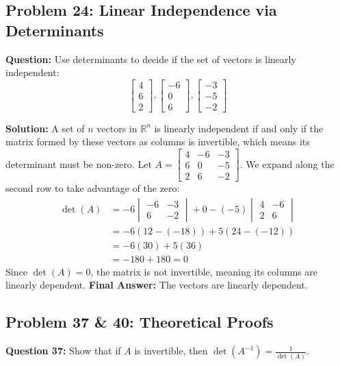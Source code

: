 \documentclass{article}
\begin{document}
\subsection{Problem 24: Linear Independence via Determinants}
\textbf{Question:} Use determinants to decide if the set of vectors is linearly independent:
\[ \begin{bmatrix} 4 \\ 6 \\ 2 \end{bmatrix}, \begin{bmatrix} -6 \\ 0 \\ 6 \end{bmatrix}, \begin{bmatrix} -3 \\ -5 \\ -2 \end{bmatrix} \]

\textbf{Solution:}
A set of $n$ vectors in $\mathbb{R}^n$ is linearly independent if and only if the matrix formed by these vectors as columns is invertible, which means its determinant must be non-zero.
Let $A = \begin{bmatrix} 4 & -6 & -3 \\ 6 & 0 & -5 \\ 2 & 6 & -2 \end{bmatrix}$.
We expand along the second row to take advantage of the zero:
\begin{align*}
    \det(A) &= -6 \begin{vmatrix} -6 & -3 \\ 6 & -2 \end{vmatrix} + 0 - (-5) \begin{vmatrix} 4 & -6 \\ 2 & 6 \end{vmatrix} \\
    &= -6(12 - (-18)) + 5(24 - (-12)) \\
    &= -6(30) + 5(36) \\
    &= -180 + 180 = 0
\end{align*}
Since $\det(A) = 0$, the matrix is not invertible, meaning its columns are linearly dependent.
\textbf{Final Answer:} The vectors are linearly dependent.

\subsection{Problem 37 \& 40: Theoretical Proofs}
\textbf{Question 37:} Show that if $A$ is invertible, then $\det(A^{-1}) = \frac{1}{\det(A)}$.
\end{document}
